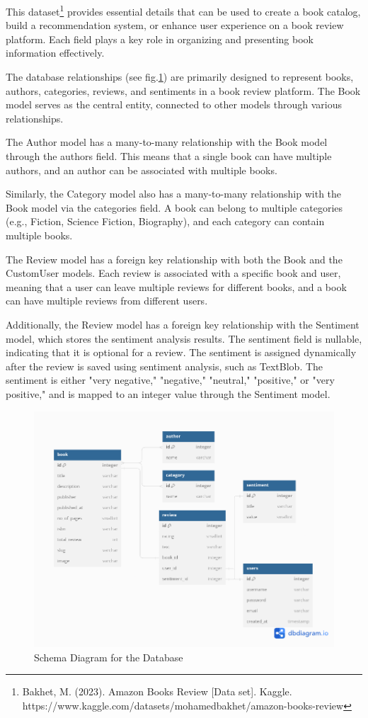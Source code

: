 This dataset\footnote{Bakhet, M. (2023). Amazon Books Review [Data set]. Kaggle. https://www.kaggle.com/datasets/mohamedbakhet/amazon-books-review} provides essential details that can be used to create a book catalog, build a recommendation system, or enhance user experience on a book review platform. Each field plays a key role in organizing and presenting book information effectively.

The database relationships (see fig.\ref{fig:database}) are primarily designed to represent books, authors, categories, reviews, and sentiments in a book review platform. The Book model serves as the central entity, connected to other models through various relationships.

The Author model has a many-to-many relationship with the Book model through the authors field. This means that a single book can have multiple authors, and an author can be associated with multiple books.

Similarly, the Category model also has a many-to-many relationship with the Book model via the categories field. A book can belong to multiple categories (e.g., Fiction, Science Fiction, Biography), and each category can contain multiple books.

The Review model has a foreign key relationship with both the Book and the CustomUser models. Each review is associated with a specific book and user, meaning that a user can leave multiple reviews for different books, and a book can have multiple reviews from different users.

Additionally, the Review model has a foreign key relationship with the Sentiment model, which stores the sentiment analysis results. The sentiment field is nullable, indicating that it is optional for a review. The sentiment is assigned dynamically after the review is saved using sentiment analysis, such as TextBlob. The sentiment is either "very negative," "negative," "neutral," "positive," or "very positive," and is mapped to an integer value through the Sentiment model.
\begin{figure}[h!]
	\begin{center}
		\includegraphics[width=.6\textwidth]{schema.png}
	\end{center}
	\caption{Schema Diagram for the Database}\label{fig:database}
\end{figure}

